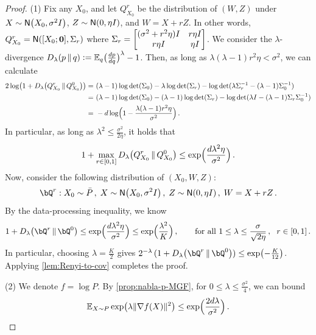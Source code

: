 \begin{proof}
\newcommand{\Qr}[1][r]{Q^{#1}_{X_0}}
\newcommand{\bQr}[1][r]{\bQ^{#1}}
(1)
Fix any $X_0$, and let $\Qr$ be the distribution of $(W,Z)$ under $X\sim \normal{X_0,\sigma^2\Id}$, $Z\sim \normal{0,\eta\Id}$, and $W=X+r Z$. In other words, $\Qr=\normal{[X_0;\bfz], \Sigma_r}$ where $\Sigma_r=\begin{bmatrix}
    (\sigma^2+r^2\eta)I & r \eta I \\
    r \eta I & \eta I 
\end{bmatrix} $. 
We consider the $\lambda$-divergence $\Dren[\lambda]{p}{q}\ldef \En_{q}\prn[\big]{\frac{dp}{dq}}^\lambda-1$. Then, as long as $\lambda(\lambda-1)r^2 \eta<\sigma^2$, we can calculate
\begin{align*}
    2\log\prn*{1+\Dren[\lambda]{\Qr}{\Qr[0]}}
    =&~(\lambda-1)\log \det(\Sigma_0)-\lambda \log\det(\Sigma_r)-\log\det (\lambda \Sigma_r\inv-(\lambda-1)\Sigma_0\inv) \\
    =&~(\lambda-1)\log \det(\Sigma_0)-(\lambda-1)\log\det(\Sigma_r)-\log\det (\lambda \Id-(\lambda-1)\Sigma_r\Sigma_0\inv) \\
    =&~ -d\log\prn[\Big]{1-\frac{\lambda(\lambda-1)r^2\eta}{\sigma^2}}\,.
\end{align*}
In particular, as long as $\lambda^2\leq \frac{\sigma^2}{2\eta}$, it holds that
\begin{align*}
    1+\max_{r\in[0,1]}\Dren[\lambda]{\Qr}{\Qr[0]}\leq \exp\prn[\Big]{\frac{d\lambda^2\eta}{\sigma^2}}\,.
\end{align*}
Now, consider the following distribution of $(X_0,W,Z)$:
\begin{align*}
    \bQr: X_0\sim \bar P\,,\; X\sim \normal{X_0,\sigma^2\Id}\,,\; Z\sim \normal{0,\eta\Id}\,,\; W=X+rZ\,. 
\end{align*}
By the data-processing inequality, we know
\begin{align*}
    1+\Dren[\lambda]{\bQr}{\bQr[0]}\leq \exp\prn[\Big]{\frac{d\lambda^2\eta}{\sigma^2}}\leq \exp\prn[\Big]{\frac{\lambda^2}{K}}\,, \qquad \text{for all}~1\leq \lambda\leq \frac{\sigma}{\sqrt{2\eta}}\,,\; ~r\in[0,1]\,.
\end{align*}
In particular, choosing $\lambda=\frac{K}{2}$ gives $2^{-\lambda}\,(1+\Dren[\lambda]{\bQr}{\bQr[0]})\leq \exp\prn*{-\frac{K}{12}}$. Applying \cref{lem:Renyi-to-cov} completes the proof.

(2) We denote $f=\log P$. By \cref{prop:nabla-p-MGF}, 
for $0\leq \lambda\leq \frac{\sigma^2}{4}$, we can bound
\begin{align*}
    \En_{X\sim P} \exp\prn*{ \lambda\nrm{\nabla f(X)}^2}
    \leq \exp\prn[\Big]{\frac{2d\lambda}{\sigma^2}}\,.
\end{align*}


\end{proof}
